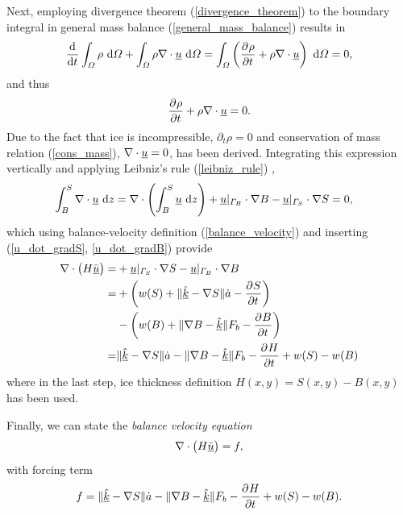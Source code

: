 Next, employing  divergence theorem (\ref{divergence_theorem}) to the boundary integral in general mass balance (\ref{general_mass_balance}) results in
\begin{align*}
  \frac{\mathrm{d}^{} }{\mathrm{d} t^{} } \int_{\varOmega} \rho \ \mathrm{d}\varOmega + \int_{\varOmega} \rho \nabla \cdot \underline{u} \ \mathrm{d}\varOmega = \int_{\varOmega} \left( \frac{\partial^{} \rho}{\partial t^{} } + \rho \nabla \cdot \underline{u} \right) \ \mathrm{d}\varOmega = 0,
\end{align*}
and thus
\begin{align*}
  \frac{\partial^{} \rho}{\partial t^{} } + \rho \nabla \cdot \underline{u} = 0.
\end{align*}
Due to the fact that ice is incompressible, $\partial_t \rho = 0$ and conservation of mass relation (\ref{cons_mass}), $\nabla \cdot \underline{u} = 0$, has been derived.  Integrating this expression vertically and applying  Leibniz's rule (\ref{leibniz_rule}) ,
\begin{align}
  \label{integrated_cons_mass}
  \int_B^S \nabla \cdot \underline{u} \ \mathrm{d}z &= \nabla \cdot \left( \int_B^S \underline{u} \ \mathrm{d}z \right) + \underline{u} |_{\varGamma_B} \cdot \nabla B - \underline{u} |_{\varGamma_S} \cdot \nabla S = 0,
\end{align}
which using balance-velocity definition (\ref{balance_velocity}) and inserting (\ref{u_dot_gradS}, \ref{u_dot_gradB}) provide
\begin{align*}
  \nabla \cdot \big( H \bar{\underline{u}} \big) = &+ \underline{u} |_{\varGamma_S} \cdot \nabla S - \underline{u} |_{\varGamma_B} \cdot \nabla B \\
  =&+ \left( w(S) + \Vert \hat{\underline{k}} - \nabla S \Vert \dot{a} - \frac{\partial^{} S}{\partial t^{} }\right) \\
  &- \left( w(B) + \Vert \nabla B - \hat{\underline{k}} \Vert F_b - \frac{\partial^{} B}{\partial t^{} } \right) \\
  =& \Vert \hat{\underline{k}} - \nabla S \Vert \dot{a} - \Vert \nabla B - \hat{\underline{k}} \Vert F_b - \frac{\partial^{} H}{\partial t^{} } + w(S) - w(B)
\end{align*}
where in the last step, ice thickness definition $H(x,y) = S(x,y) - B(x,y)$ has been used.

Finally, we can state the \emph{balance velocity equation}
\begin{align}
  \label{balance_velocity_equation_one}
  \nabla \cdot \big( H \bar{\underline{u}} \big) = f,
\end{align}
with forcing term
\begin{align}
  \label{balance_velocity_equation_f}
  f = \Vert \hat{\underline{k}} - \nabla S \Vert \dot{a} - \Vert \nabla B - \hat{\underline{k}} \Vert F_b - \frac{\partial^{} H}{\partial t^{} } + w(S) - w(B).
\end{align}

